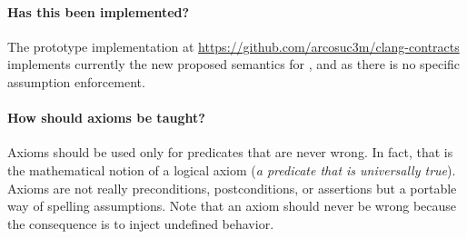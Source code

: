 \paragraph{Has this been implemented?}
The prototype implementation at
\url{https://github.com/arcosuc3m/clang-contracts} implements currently the new
proposed semantics for ,  and  as there
is no specific assumption enforcement.

\paragraph{How should axioms be taught?}
Axioms should be used only for predicates that are never wrong.
In fact, that is the mathematical notion of a logical axiom 
(\emph{a predicate that is universally true}).
Axioms are not really preconditions, postconditions, or assertions but
a portable way of spelling assumptions.
Note that an axiom should never be wrong because the consequence is
to inject undefined behavior.
